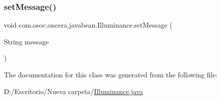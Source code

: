 \subsubsection{\texorpdfstring{setMessage()}{setMessage()}}
{\footnotesize\ttfamily void com.\+osoc.\+oncera.\+javabean.\+Illuminance.\+set\+Message (\begin{DoxyParamCaption}\item[{String}]{message }\end{DoxyParamCaption})}



The documentation for this class was generated from the following file\+:\begin{DoxyCompactItemize}
\item 
D\+:/\+Escritorio/\+Nueva carpeta/\mbox{\hyperlink{_illuminance_8java}{Illuminance.\+java}}\end{DoxyCompactItemize}
